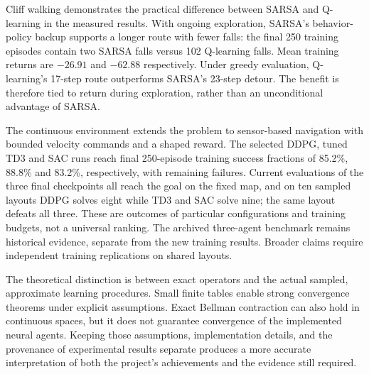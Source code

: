 \documentclass[11pt,a4paper]{article}
\theoremstyle{definition}
\theoremstyle{plain}
\theoremstyle{remark}
\begin{document}
Cliff walking demonstrates the practical difference between SARSA and Q-learning in the measured results. With ongoing exploration, SARSA's behavior-policy backup supports a longer route with fewer falls: the final 250 training episodes contain two SARSA falls versus 102 Q-learning falls. Mean training returns are $-26.91$ and $-62.88$ respectively. Under greedy evaluation, Q-learning's 17-step route outperforms SARSA's 23-step detour. The benefit is therefore tied to return during exploration, rather than an unconditional advantage of SARSA.

The continuous environment extends the problem to sensor-based navigation with bounded velocity commands and a shaped reward. The selected DDPG, tuned TD3 and SAC runs reach final 250-episode training success fractions of 85.2\%, 88.8\% and 83.2\%, respectively, with remaining failures. Current evaluations of the three final checkpoints all reach the goal on the fixed map, and on ten sampled layouts DDPG solves eight while TD3 and SAC solve nine; the same layout defeats all three. These are outcomes of particular configurations and training budgets, not a universal ranking. The archived three-agent benchmark remains historical evidence, separate from the new training results. Broader claims require independent training replications on shared layouts.

The theoretical distinction is between exact operators and the actual sampled, approximate learning procedures. Small finite tables enable strong convergence theorems under explicit assumptions. Exact Bellman contraction can also hold in continuous spaces, but it does not guarantee convergence of the implemented neural agents. Keeping those assumptions, implementation details, and the provenance of experimental results separate produces a more accurate interpretation of both the project's achievements and the evidence still required.
\FloatBarrier
\end{document}
